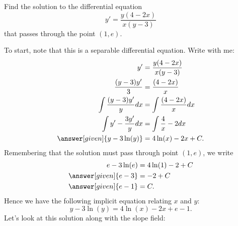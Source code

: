 \documentclass{ximera}
\begin{document}
\begin{example}
  Find the solution to the differential equation
  \[
  y' = \frac{y(4-2x)}{x(y-3)}
  \]
  that passes through the point $(1,e)$.
  \begin{explanation}
    To start, note that this is a separable differential equation. Write with me:
    \begin{align*}
      y' &= \frac{y(4-2x)}{x(y-3)}\\
      \frac{(y-3)y'}{3}&=\frac{(4-2x)}{x}\\
      \int \frac{(y-3)y'}{y} dx&=\int \frac{(4-2x)}{x} dx\\
      \int y'-\frac{3y'}{y} dx&=\int \frac{4}{x}-2 dx\\
      \answer[given]{y-3\ln(y)} &=4\ln(x)-2x+C.
    \end{align*}
    Remembering that the solution must pass through point $(1,e)$, we write
    \begin{align*}
      e-3\ln(e) &=4\ln(1)-2+C\\
      \answer[given]{e-3} &=-2+C\\
      \answer[given]{e-1} &=C.
    \end{align*}
    Hence we have the following implicit equation relating $x$ and $y$:
    \[
    y-3\ln(y) =4\ln(x)-2x+e-1.
    \]
    Let's look at this solution along with the slope field:
    \begin{image}
      {\def\length{sqrt((-3*x+1*x*y)^2+(4*y-2*x*y)^2)}
        }
\end{image}
\end{explanation}
\end{example}
\end{document}
